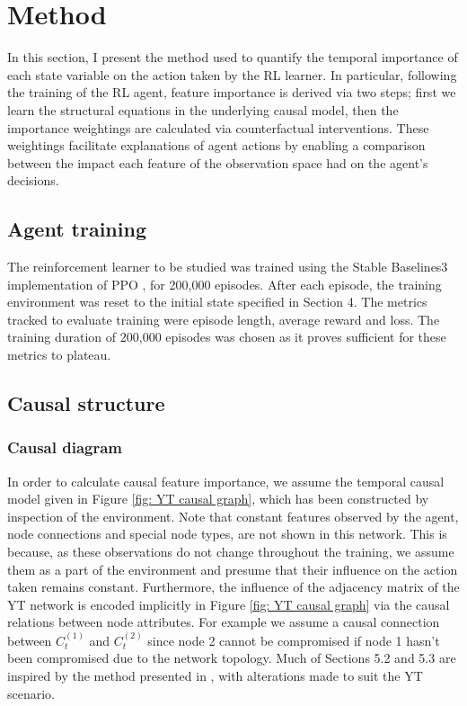 \documentclass{article}
\begin{document}
\pagebreak

\section{Method}
In this section, I present the method used to quantify the temporal importance of each state variable on the action taken by the RL learner. In particular, following the training of the RL agent, feature importance is derived via two steps; first we learn the structural equations in the underlying causal model, then the importance weightings are calculated via counterfactual interventions. These weightings facilitate explanations of agent actions by enabling a comparison between the impact each feature of the observation space had on the agent's decisions.

\subsection{Agent training}
The reinforcement learner to be studied was trained using the Stable Baselines3 implementation of PPO \cite{stable-baselines3}, for 200,000 episodes. After each episode, the training environment was reset to the initial state specified in Section 4. The metrics tracked to evaluate training were episode length, average reward and loss. The training duration of 200,000 episodes was chosen as it proves sufficient for these metrics to plateau. 



\subsection{Causal structure}

\subsubsection{Causal diagram}
In order to calculate causal feature importance, we assume the temporal causal model given in Figure \ref{fig: YT causal graph}, which has been constructed by inspection of the environment. Note that constant features observed by the agent, node connections and special node types, are not shown in this network. This is because, as these observations do not change throughout the training, we assume them as a part of the environment and presume that their influence on the action taken remains constant. Furthermore, the influence of the adjacency matrix of the YT network is encoded implicitly in Figure \ref{fig: YT causal graph} via the causal relations between node attributes. For example we assume a causal connection between $C_t^{(1)}$ and $C_t^{(2)}$ since node 2 cannot be compromised if node 1 hasn't been compromised due to the network topology. Much of Sections 5.2 and 5.3 are inspired by the method presented in \cite{wang2022causal}, with alterations made to suit the YT scenario.
\end{document}
